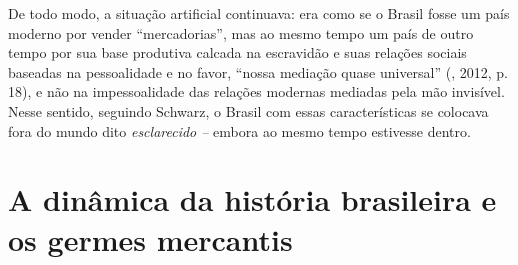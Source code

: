 De todo modo, a situação artificial continuava: era como se o Brasil
fosse um país moderno por vender ``mercadorias'', mas ao mesmo tempo um
país de outro tempo por sua base produtiva calcada na escravidão e suas
relações sociais baseadas na pessoalidade e no favor, ``nossa mediação
quase universal'' (, 2012, p. 18), e não na impessoalidade das
relações modernas mediadas pela mão invisível. Nesse sentido,
seguindo Schwarz, o Brasil com essas características se colocava fora do
mundo dito \emph{esclarecido --} embora ao mesmo tempo estivesse dentro.

\section{A dinâmica da história brasileira e os germes mercantis}

